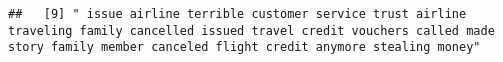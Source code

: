 \documentclass[
]{article}
\begin{document}
\begin{verbatim}
##   [9] " issue airline terrible customer service trust airline traveling family cancelled issued travel credit vouchers called made story family member canceled flight credit anymore stealing money"                                                                                                                                                                                                                                                                                                                                                                                                                                                                                                                                                                                                                                                                                                                                                                                                                                                                                                                                                                                                                                                                                                                                                                                                                                                                                                                                                                                                                                                                                                                                                                                                 

\end{verbatim}
\end{document}
